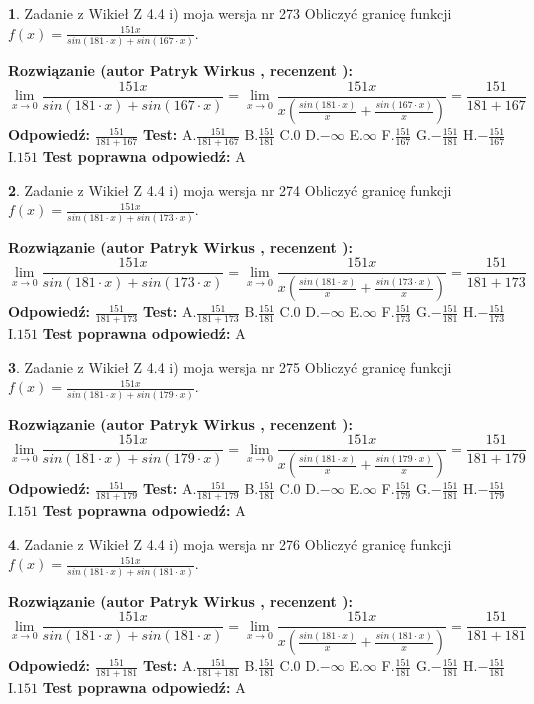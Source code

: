 \documentclass[12pt, a4paper]{article}
\theoremstyle{definition} %
\newtheorem{zad}{}
\newcommand{\zadStart}[1]{\begin{zad}#1\newline}
\newcommand{\zadStop}{\end{zad}}
\newcommand{\rozwStart}[2]{\noindent \textbf{Rozwiązanie (autor #1 , recenzent #2): }\newline}
\newcommand{\rozwStop}{\newline}
\newcommand{\odpStart}{\noindent \textbf{Odpowiedź:}\newline}
\newcommand{\odpStop}{\newline}
\newcommand{\testStart}{\noindent \textbf{Test:}\newline}
\newcommand{\testStop}{\newline}
\newcommand{\kluczStart}{\noindent \textbf{Test poprawna odpowiedź:}\newline}
\newcommand{\kluczStop}{\newline}
\begin{document}
\zadStart{Zadanie z Wikieł Z 4.4 i) moja wersja nr 273}
Obliczyć granicę funkcji $f(x)=\frac{151x}{sin(181\cdot x) +sin(167\cdot x)}$.
\zadStop
\rozwStart{Patryk Wirkus}{}
$$\lim\limits_{x\to 0}\frac{151x}{sin(181\cdot x) +sin(167\cdot x)}=\lim\limits_{x\to 0}\frac{151x}{x(\frac{sin(181\cdot x)}{x}+\frac{sin(167\cdot x)}{x})}=\frac{151}{181+167}$$
\rozwStop
\odpStart
$\frac{151}{181+167}$
\odpStop
\testStart
A.$\frac{151}{181+167}$
B.$\frac{151}{181}$
C.$0$
D.$-\infty$
E.$\infty$
F.$\frac{151}{167}$
G.$-\frac{151}{181}$
H.$-\frac{151}{167}$
I.$151$
\testStop
\kluczStart
A
\kluczStop



\zadStart{Zadanie z Wikieł Z 4.4 i) moja wersja nr 274}
Obliczyć granicę funkcji $f(x)=\frac{151x}{sin(181\cdot x) +sin(173\cdot x)}$.
\zadStop
\rozwStart{Patryk Wirkus}{}
$$\lim\limits_{x\to 0}\frac{151x}{sin(181\cdot x) +sin(173\cdot x)}=\lim\limits_{x\to 0}\frac{151x}{x(\frac{sin(181\cdot x)}{x}+\frac{sin(173\cdot x)}{x})}=\frac{151}{181+173}$$
\rozwStop
\odpStart
$\frac{151}{181+173}$
\odpStop
\testStart
A.$\frac{151}{181+173}$
B.$\frac{151}{181}$
C.$0$
D.$-\infty$
E.$\infty$
F.$\frac{151}{173}$
G.$-\frac{151}{181}$
H.$-\frac{151}{173}$
I.$151$
\testStop
\kluczStart
A
\kluczStop



\zadStart{Zadanie z Wikieł Z 4.4 i) moja wersja nr 275}
Obliczyć granicę funkcji $f(x)=\frac{151x}{sin(181\cdot x) +sin(179\cdot x)}$.
\zadStop
\rozwStart{Patryk Wirkus}{}
$$\lim\limits_{x\to 0}\frac{151x}{sin(181\cdot x) +sin(179\cdot x)}=\lim\limits_{x\to 0}\frac{151x}{x(\frac{sin(181\cdot x)}{x}+\frac{sin(179\cdot x)}{x})}=\frac{151}{181+179}$$
\rozwStop
\odpStart
$\frac{151}{181+179}$
\odpStop
\testStart
A.$\frac{151}{181+179}$
B.$\frac{151}{181}$
C.$0$
D.$-\infty$
E.$\infty$
F.$\frac{151}{179}$
G.$-\frac{151}{181}$
H.$-\frac{151}{179}$
I.$151$
\testStop
\kluczStart
A
\kluczStop



\zadStart{Zadanie z Wikieł Z 4.4 i) moja wersja nr 276}
Obliczyć granicę funkcji $f(x)=\frac{151x}{sin(181\cdot x) +sin(181\cdot x)}$.
\zadStop
\rozwStart{Patryk Wirkus}{}
$$\lim\limits_{x\to 0}\frac{151x}{sin(181\cdot x) +sin(181\cdot x)}=\lim\limits_{x\to 0}\frac{151x}{x(\frac{sin(181\cdot x)}{x}+\frac{sin(181\cdot x)}{x})}=\frac{151}{181+181}$$
\rozwStop
\odpStart
$\frac{151}{181+181}$
\odpStop
\testStart
A.$\frac{151}{181+181}$
B.$\frac{151}{181}$
C.$0$
D.$-\infty$
E.$\infty$
F.$\frac{151}{181}$
G.$-\frac{151}{181}$
H.$-\frac{151}{181}$
I.$151$
\testStop
\kluczStart
A
\kluczStop
\end{document}
